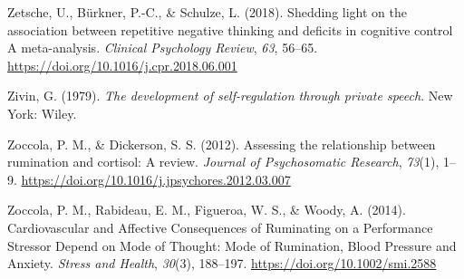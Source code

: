\documentclass[a4paper,12pt,twoside,openright,oldfontcommands]{memoir}
\begin{document}
\leavevmode\hypertarget{ref-zetsche_shedding_2018}{}%
Zetsche, U., Bürkner, P.-C., \& Schulze, L. (2018). Shedding light on the association between repetitive negative thinking and deficits in cognitive control A meta-analysis. \emph{Clinical Psychology Review}, \emph{63}, 56--65. \url{https://doi.org/10.1016/j.cpr.2018.06.001}

\leavevmode\hypertarget{ref-zivin_development_1979}{}%
Zivin, G. (1979). \emph{The development of self-regulation through private speech}. New York: Wiley.

\leavevmode\hypertarget{ref-zoccola_assessing_2012}{}%
Zoccola, P. M., \& Dickerson, S. S. (2012). Assessing the relationship between rumination and cortisol: A review. \emph{Journal of Psychosomatic Research}, \emph{73}(1), 1--9. \url{https://doi.org/10.1016/j.jpsychores.2012.03.007}

\leavevmode\hypertarget{ref-zoccola_cardiovascular_2014}{}%
Zoccola, P. M., Rabideau, E. M., Figueroa, W. S., \& Woody, A. (2014). Cardiovascular and Affective Consequences of Ruminating on a Performance Stressor Depend on Mode of Thought: Mode of Rumination, Blood Pressure and Anxiety. \emph{Stress and Health}, \emph{30}(3), 188--197. \url{https://doi.org/10.1002/smi.2588}
\end{document}
